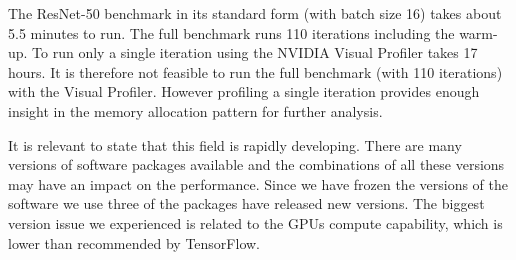 \documentclass[12pt,twoside]{article}
\begin{document}
The ResNet-50 benchmark in its standard form (with batch size 16) takes about 5.5 minutes to run. The full benchmark runs 110 iterations including the warm-up. To run only a single iteration using the NVIDIA Visual Profiler takes 17 hours. It is therefore not feasible to run the full benchmark (with 110 iterations) with the Visual Profiler. However profiling a single iteration provides enough insight in the memory allocation pattern for further analysis.

It is relevant to state that this field is rapidly developing. There are many versions of software packages available and the combinations of all these versions may have an impact on the performance. Since we have frozen the versions of the software we use three of the packages have released new versions. The biggest version issue we experienced is related to the GPUs compute capability, which is lower than recommended by TensorFlow.




\end{document}
